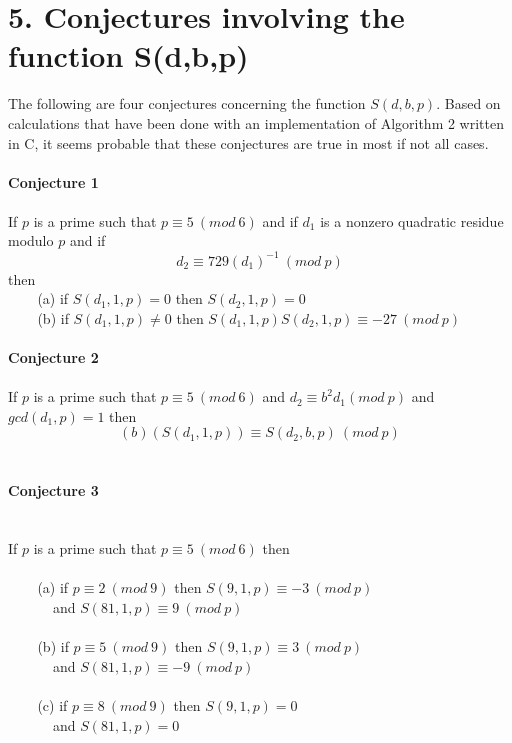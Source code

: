 \documentclass[final,letterpaper,oneside,10pt]{article}
\begin{document}
\section*{5. Conjectures involving the function S(d,b,p) }


The following are four conjectures concerning the function $S(d,b,p)$.  Based on calculations that have been done with an implementation of 
Algorithm 2 written in C, it seems probable that these conjectures are true in most if not all cases.
\\
\\
\textbf{Conjecture 1}
\\
\\
If $p$ is a prime such that $p \equiv 5~(mod~6)$ and if $d_1$ is a nonzero quadratic residue modulo $p$ and if
\[d_2 \equiv 729(d_1)^{-1}~(mod~p)\]
then
\\
$~~~~~~~~$ (a) if $S(d_1,1,p)=0$ then $S(d_2,1,p)=0$
\\
$~~~~~~~~$  (b) if $ S(d_1,1,p) \ne 0$ then $S(d_1,1,p)S(d_2,1,p) \equiv -27~(mod~p)$
\\
\\
\textbf{Conjecture 2}
\\
\\
If $p$ is a prime such that $p \equiv 5~(mod~6)$ and $d_2 \equiv b^2d_1(mod~p)$ and $gcd(d_1,p)=1$ then
\\
\[(b)(S(d_1,1,p)) \equiv S(d_2,b,p)~(mod~p)\]
\\
\\
\textbf{Conjecture 3}
\\
\\
\\
If $p$ is a prime such that $p \equiv 5~(mod~6)$ then
\\
\\
$~~~~~~~~$ (a) if $p \equiv 2~(mod~9)$ then $S(9,1,p) \equiv -3~(mod~p)$ 
\\
$~~~~~~~~~~~~~$ and $S(81,1,p) \equiv 9~(mod~p)$
\\
\\
$~~~~~~~~$ (b) if $p \equiv 5~(mod~9)$ then $S(9,1,p) \equiv 3~(mod~p)$ 
\\
$~~~~~~~~~~~~~$ and $S(81,1,p) \equiv -9~(mod~p)$
\\
\\
$~~~~~~~~$ (c) if $p \equiv 8~(mod~9)$ then $S(9,1,p) = 0$ 
\\
$~~~~~~~~~~~~~$ and $S(81,1,p) =0$
\\
\\
\\
\end{document}
